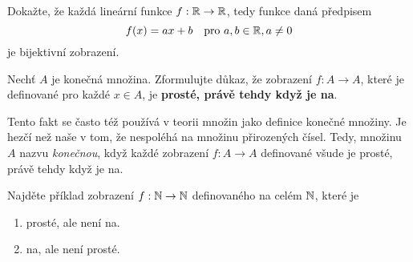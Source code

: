 \begin{exercise}
 Dokažte, že každá lineární funkce $f:\mathbb{R} \to \mathbb{R}$, tedy funkce daná předpisem
 \[
  f(x) = ax + b \quad \text{pro } a,b \in \mathbb{R},a \neq 0
 \]
 je bijektivní zobrazení.
\end{exercise}

\begin{exercise}
 Nechť $A$ je konečná množina. Zformulujte důkaz, že zobrazení ${f:A \to A}$,
 které je definované pro každé $x \in A$, je \textbf{prosté, právě tehdy když je
 na}.

 Tento fakt se často též používá v teorii množin jako definice konečné množiny.
 Je hezčí než naše v tom, že nespoléhá na množinu přirozených čísel. Tedy,
 množinu $A$ nazvu \emph{konečnou}, když každé zobrazení $f:A \to A$ definované
 všude je prosté, právě tehdy když je na.
\end{exercise}

\begin{exercise}
 Najděte příklad zobrazení $f:\mathbb{N} \to \mathbb{N}$ definovaného na celém $\mathbb{N}$, které je
 \begin{enumerate}
  \item prosté, ale není na.
  \item na, ale není prosté.
 \end{enumerate}
\end{exercise}

